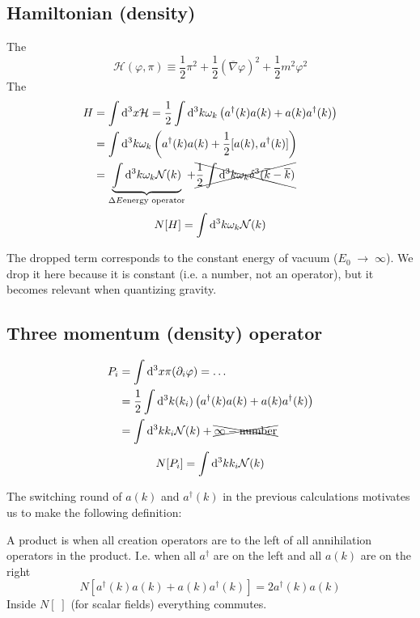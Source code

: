 \subsection{Hamiltonian (density)}
The 
\[ \mathcal{H}(\varphi, \pi) \equiv \frac{1}{2}\pi^2 + \frac{1}{2}(\overline{\nabla}\varphi)^2 + \frac{1}{2}m^2\varphi^2 \]
The 
\begin{align*}
H &= \int \operatorname{d \!}{^3x}\mathcal{H} = \frac{1}{2}\int\operatorname{d \!}{^3k}\omega_k \left(a^\dagger(k)a(k) + a(k)a^\dagger(k)\right) \\
&= \int\operatorname{d \!}{^3k}\omega_k \left(a^\dagger(k)a(k) + \frac{1}{2}[a(k),a^\dagger(k)]\right) \\
&= \underbrace{\int \operatorname{d \!}{^3k}\omega_k\mathcal{N}(k)}_{\Delta E \text{energy operator}} + \xcancel{\frac{1}{2}\int \operatorname{d \!}{^3k}\omega_k\delta^3(\overline{k}- \overline{k})}
\end{align*}
\[ N[H] = \int \operatorname{d \!}{^3k}\omega_k\mathcal{N}(k) \]

The dropped term corresponds to the constant energy of vacuum ($E_0 \;\to\; \infty$). We drop it here because it is constant (i.e. a number, not an operator), but it becomes relevant when quantizing gravity.

\subsection{Three momentum (density) operator}
\begin{align*}
P_i &= \int \operatorname{d \!}{^3x}\pi(\partial_i\varphi) = \ldots \\
&= \frac{1}{2}\int \operatorname{d \!}{^3k}(k_i)\left(a^\dagger(k)a(k)+ a(k)a^\dagger(k)\right) \\
&= \int \operatorname{d \!}{^3k} k_i \mathcal{N}(k) + \xcancel{\infty -\text{number}}
\end{align*}
\[ N[P_i] = \int \operatorname{d \!}{^3k} k_i \mathcal{N}(k) \]

The switching round of $a(k)$ and $a^\dagger(k)$ in the previous calculations motivates us to make the following definition:
\begin{definition}
A product is  when all creation operators are to the left of all annihilation operators in the product. I.e. when all $a^\dagger$ are on the left and all $a(k)$ are on the right
\[ N[a^\dagger(k)a(k) + a(k)a^\dagger(k)] = 2 a^\dagger(k)a(k) \]
Inside $N[\;]$ (for scalar fields) everything commutes.
\end{definition}

